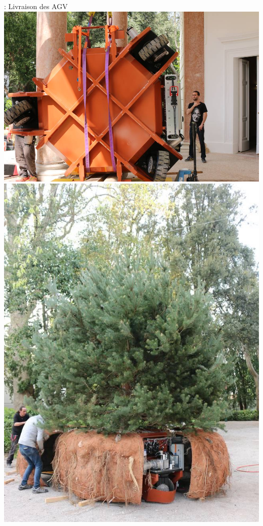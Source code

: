 \documentclass[12pt]{beamer}
\begin{document}
                \begin{frame}{\subsubsecname: Livraison des AGV}
                    \includegraphics[width=\linewidth/3*2]{img/agv_vert.jpg}
                    \includegraphics[width=\linewidth/3]{img/motte.jpg}
                \end{frame}
\end{document}

